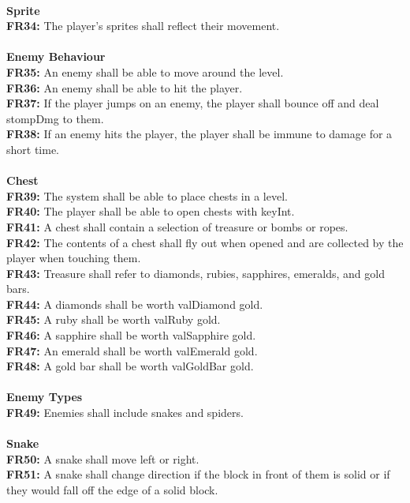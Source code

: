 \documentclass[12pt, titlepage]{article}
\begin{document}
\\
\textbf{Sprite}\\
\textbf{FR34:} The player's sprites shall reflect their movement.\\
\\
\textbf{Enemy Behaviour}\\
\textbf{FR35:} An enemy shall be able to move around the level.\\
\textbf{FR36:} An enemy shall be able to hit the player.\\
\textbf{FR37:} If the player jumps on an enemy, the player shall bounce off and deal stompDmg to them.\\
\textbf{FR38:} If an enemy hits the player, the player shall be immune to damage for a short time.\\
\\
\textbf{Chest}\\
\textbf{FR39:} The system shall be able to place chests in a level.\\
\textbf{FR40:} The player shall be able to open chests with keyInt.\\
\textbf{FR41:} A chest shall contain a selection of treasure or bombs or ropes.\\
\textbf{FR42:} The contents of a chest shall fly out when opened and are collected by the player when touching them.\\
\textbf{FR43:} Treasure shall refer to diamonds, rubies, sapphires, emeralds, and gold bars.\\
\textbf{FR44:} A diamonds shall be worth valDiamond gold.\\
\textbf{FR45:} A ruby shall be worth valRuby gold.\\
\textbf{FR46:} A sapphire shall be worth valSapphire gold.\\
\textbf{FR47:} An emerald shall be worth valEmerald gold.\\
\textbf{FR48:} A gold bar shall be worth valGoldBar gold.\\
\\
\textbf{Enemy Types}\\
\textbf{FR49:} Enemies shall include snakes and spiders.\\
\\
\textbf{Snake}\\
\textbf{FR50:} A snake shall move left or right.\\
\textbf{FR51:} A snake shall change direction if the block in front of them is solid or if they would fall off the edge of a solid block.\\
\end{document}
